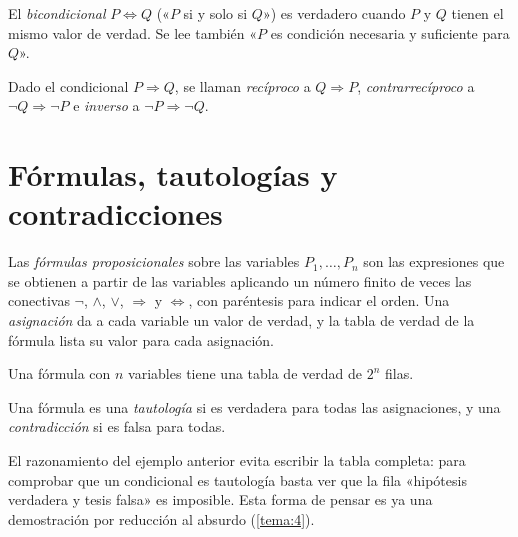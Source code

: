 \begin{definicion}[Bicondicional]\label{def:bicondicional}
El \emph{bicondicional} $P\Leftrightarrow Q$ («$P$ si y solo si $Q$») es verdadero cuando $P$ y $Q$ tienen el mismo valor de verdad. Se lee también «$P$ es condición necesaria y suficiente para $Q$».
\end{definicion}

\begin{definicion}\label{def:reciproco}
Dado el condicional $P\Rightarrow Q$, se llaman \emph{recíproco} a $Q\Rightarrow P$, \emph{contrarrecíproco} a $\neg Q\Rightarrow\neg P$ e \emph{inverso} a $\neg P\Rightarrow\neg Q$.
\end{definicion}

\addtocounter{definicion}{1}%

\section{Fórmulas, tautologías y contradicciones}

\begin{definicion}
Las \emph{fórmulas proposicionales} sobre las variables $P_1,\dots,P_n$ son las expresiones que se obtienen a partir de las variables aplicando un número finito de veces las conectivas $\neg$, $\wedge$, $\vee$, $\Rightarrow$ y $\Leftrightarrow$, con paréntesis para indicar el orden. Una \emph{asignación} da a cada variable un valor de verdad, y la tabla de verdad de la fórmula lista su valor para cada asignación.
\end{definicion}

\begin{proposicion}\label{prop:filas}
Una fórmula con $n$ variables tiene una tabla de verdad de $2^{n}$ filas.
\end{proposicion}

\begin{definicion}
Una fórmula es una \emph{tautología} si es verdadera para todas las asignaciones, y una \emph{contradicción} si es falsa para todas.
\end{definicion}

\addtocounter{definicion}{1}%

El razonamiento del ejemplo anterior evita escribir la tabla completa: para comprobar que un condicional es tautología basta ver que la fila «hipótesis verdadera y tesis falsa» es imposible. Esta forma de pensar es ya una demostración por reducción al absurdo (\cref{tema:4}).

